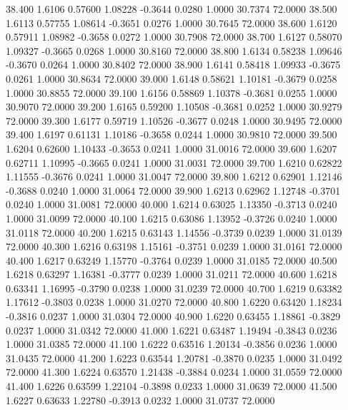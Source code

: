   38.400   1.6106   0.57600   1.08228  -0.3644   0.0280   1.0000  30.7374  72.0000
  38.500   1.6113   0.57755   1.08614  -0.3651   0.0276   1.0000  30.7645  72.0000
  38.600   1.6120   0.57911   1.08982  -0.3658   0.0272   1.0000  30.7908  72.0000
  38.700   1.6127   0.58070   1.09327  -0.3665   0.0268   1.0000  30.8160  72.0000
  38.800   1.6134   0.58238   1.09646  -0.3670   0.0264   1.0000  30.8402  72.0000
  38.900   1.6141   0.58418   1.09933  -0.3675   0.0261   1.0000  30.8634  72.0000
  39.000   1.6148   0.58621   1.10181  -0.3679   0.0258   1.0000  30.8855  72.0000
  39.100   1.6156   0.58869   1.10378  -0.3681   0.0255   1.0000  30.9070  72.0000
  39.200   1.6165   0.59200   1.10508  -0.3681   0.0252   1.0000  30.9279  72.0000
  39.300   1.6177   0.59719   1.10526  -0.3677   0.0248   1.0000  30.9495  72.0000
  39.400   1.6197   0.61131   1.10186  -0.3658   0.0244   1.0000  30.9810  72.0000
  39.500   1.6204   0.62600   1.10433  -0.3653   0.0241   1.0000  31.0016  72.0000
  39.600   1.6207   0.62711   1.10995  -0.3665   0.0241   1.0000  31.0031  72.0000
  39.700   1.6210   0.62822   1.11555  -0.3676   0.0241   1.0000  31.0047  72.0000
  39.800   1.6212   0.62901   1.12146  -0.3688   0.0240   1.0000  31.0064  72.0000
  39.900   1.6213   0.62962   1.12748  -0.3701   0.0240   1.0000  31.0081  72.0000
  40.000   1.6214   0.63025   1.13350  -0.3713   0.0240   1.0000  31.0099  72.0000
  40.100   1.6215   0.63086   1.13952  -0.3726   0.0240   1.0000  31.0118  72.0000
  40.200   1.6215   0.63143   1.14556  -0.3739   0.0239   1.0000  31.0139  72.0000
  40.300   1.6216   0.63198   1.15161  -0.3751   0.0239   1.0000  31.0161  72.0000
  40.400   1.6217   0.63249   1.15770  -0.3764   0.0239   1.0000  31.0185  72.0000
  40.500   1.6218   0.63297   1.16381  -0.3777   0.0239   1.0000  31.0211  72.0000
  40.600   1.6218   0.63341   1.16995  -0.3790   0.0238   1.0000  31.0239  72.0000
  40.700   1.6219   0.63382   1.17612  -0.3803   0.0238   1.0000  31.0270  72.0000
  40.800   1.6220   0.63420   1.18234  -0.3816   0.0237   1.0000  31.0304  72.0000
  40.900   1.6220   0.63455   1.18861  -0.3829   0.0237   1.0000  31.0342  72.0000
  41.000   1.6221   0.63487   1.19494  -0.3843   0.0236   1.0000  31.0385  72.0000
  41.100   1.6222   0.63516   1.20134  -0.3856   0.0236   1.0000  31.0435  72.0000
  41.200   1.6223   0.63544   1.20781  -0.3870   0.0235   1.0000  31.0492  72.0000
  41.300   1.6224   0.63570   1.21438  -0.3884   0.0234   1.0000  31.0559  72.0000
  41.400   1.6226   0.63599   1.22104  -0.3898   0.0233   1.0000  31.0639  72.0000
  41.500   1.6227   0.63633   1.22780  -0.3913   0.0232   1.0000  31.0737  72.0000
